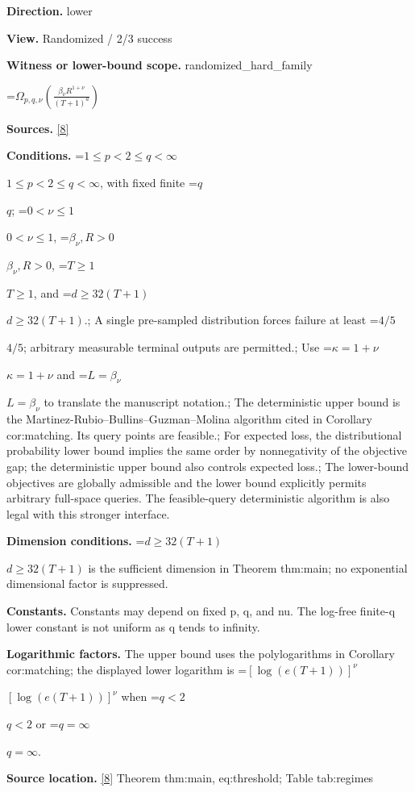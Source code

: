 \documentclass[10pt,a4paper]{article}
\newcommand{\AtlasMath}[1]{\par\begingroup\centering\setbox0=\hbox{$\displaystyle #1$}\ifdim\wd0>1.4\linewidth\typeout{ATLAS WIDE FORMULA: \the\wd0}\fi\ifdim\wd0>\linewidth\resizebox{\linewidth}{!}{\box0}\else\box0\fi\par\endgroup}
\newcommand{\AtlasInlineMath}[1]{\begingroup\setbox0=\hbox{$#1$}\ifdim\wd0>.4\linewidth\endgroup\AtlasMath{#1}\else\endgroup$#1$\fi}
\begin{document}
\textbf{Direction.} lower



\textbf{View.} Randomized / 2/3 success



\textbf{Witness or lower-bound scope.} randomized\_hard\_family



\AtlasMath{\Omega_{p,q,\nu}\!\left(\frac{\beta_\nu R^{1+\nu}}{(T+1)^a}\right)}


\textbf{Sources.} \href{https://github.com/WU-Wendao/Colombo/blob/main/colombo_sensorium/Complexity_altas/data/sources/colombo/B1/manuscript.pdf}{[8]}



\textbf{Conditions.} \AtlasInlineMath{1\le p<2\le q<\infty}, with fixed finite \AtlasInlineMath{q}; \AtlasInlineMath{0<\nu\le1}, \AtlasInlineMath{\beta_\nu,R>0}, \AtlasInlineMath{T\ge1}, and \AtlasInlineMath{d\ge32(T+1)}.; A single pre-sampled distribution forces failure at least \AtlasInlineMath{4/5}; arbitrary measurable terminal outputs are permitted.; Use \AtlasInlineMath{\kappa=1+\nu} and \AtlasInlineMath{L=\beta_\nu} to translate the manuscript notation.; The deterministic upper bound is the Martinez-Rubio--Bullins--Guzman--Molina algorithm cited in Corollary cor:matching. Its query points are feasible.; For expected loss, the distributional probability lower bound implies the same order by nonnegativity of the objective gap; the deterministic upper bound also controls expected loss.; The lower-bound objectives are globally admissible and the lower bound explicitly permits arbitrary full-space queries. The feasible-query deterministic algorithm is also legal with this stronger interface.



\textbf{Dimension conditions.} \AtlasInlineMath{d\ge32(T+1)} is the sufficient dimension in Theorem thm:main; no exponential dimensional factor is suppressed.



\textbf{Constants.} Constants may depend on fixed p, q, and nu. The log-free finite-q lower constant is not uniform as q tends to infinity.



\textbf{Logarithmic factors.} The upper bound uses the polylogarithms in Corollary cor:matching; the displayed lower logarithm is \AtlasInlineMath{[\log(e(T+1))]^\nu} when \AtlasInlineMath{q<2} or \AtlasInlineMath{q=\infty}.



\textbf{Source location.} \href{https://github.com/WU-Wendao/Colombo/blob/main/colombo_sensorium/Complexity_altas/data/sources/colombo/B1/manuscript.pdf}{[8]} Theorem thm:main, eq:threshold; Table tab:regimes
\end{document}
